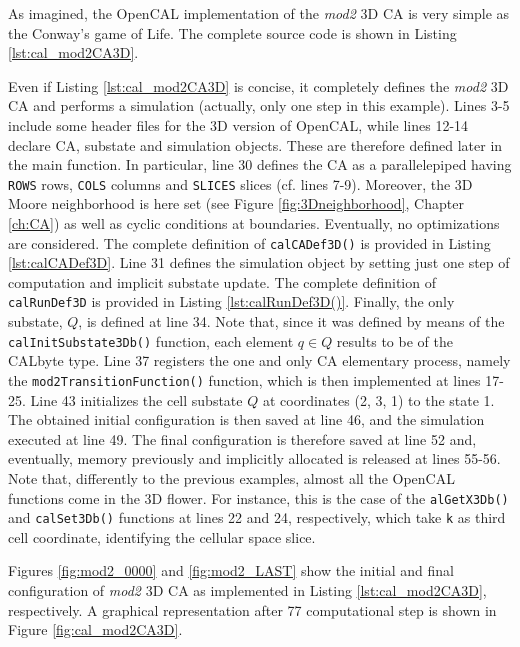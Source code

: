 As imagined, the OpenCAL implementation of the \emph{mod2} 3D
CA is very simple as the Conway's game of Life. The complete
source code is shown in Listing \ref{lst:cal_mod2CA3D}.





Even if Listing \ref{lst:cal_mod2CA3D} is concise, it completely
defines the \emph{mod2} 3D CA and performs a simulation (actually,
only one step in this example). Lines 3-5 include some header files
for the 3D version of OpenCAL, while lines 12-14 declare CA, substate
and simulation objects. These are therefore defined later in the main
function. In particular, line 30 defines the CA as a parallelepiped
having \verb'ROWS' rows, \verb'COLS' columns and \verb'SLICES' slices
(cf. lines 7-9). Moreover, the 3D Moore neighborhood is here set (see Figure \ref{fig:3Dneighborhood}, Chapter \ref{ch:CA}) as
well as cyclic conditions at boundaries. Eventually, no optimizations
are considered. The complete definition of \verb'calCADef3D()' is
provided in Listing \ref{lst:calCADef3D}. Line 31 defines the
simulation object by setting just one step of computation and implicit
substate update. The complete definition of \verb'calRunDef3D' is
provided in Listing \ref{lst:calRunDef3D()}. Finally, the only substate,
$Q$, is defined at line 34. Note that, since it was defined by means
of the \verb'calInitSubstate3Db()' function, each element $q \in Q$
results to be of the CALbyte type. Line 37 registers the one and only
CA elementary process, namely the \verb'mod2TransitionFunction()'
function, which is then implemented at lines 17-25. Line 43
initializes the cell substate $Q$ at coordinates (2, 3, 1) to the
state 1. The obtained initial configuration is then saved at line 46,
and the simulation executed at line 49. The final configuration is
therefore saved at line 52 and, eventually, memory previously and
implicitly allocated is released at lines 55-56. Note that,
differently to the previous examples, almost all the OpenCAL functions
come in the 3D flower. For instance, this is the case of the
\verb'alGetX3Db()' and \verb'calSet3Db()' functions at lines 22 and
24, respectively, which take \verb'k' as third cell coordinate,
identifying the cellular space slice.

Figures \ref{fig:mod2_0000} and \ref{fig:mod2_LAST} show the initial
and final configuration of \emph{mod2} 3D CA as implemented in Listing
\ref{lst:cal_mod2CA3D}, respectively. A graphical representation after
77 computational step is shown in Figure \ref{fig:cal_mod2CA3D}.


